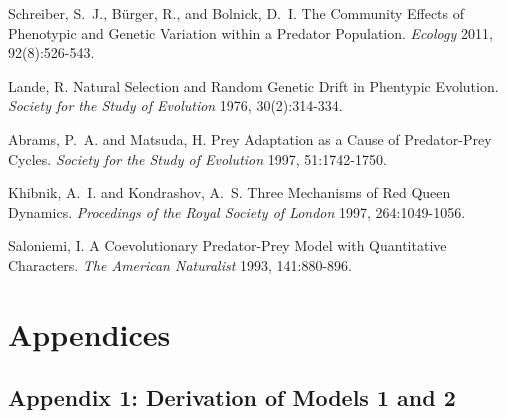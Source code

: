 \documentclass{amsart}
\theoremstyle{definition}
\theoremstyle{remark}
\numberwithin{equation}{section}
\begin{document}
\pagebreak

\begin{thebibliography}{10}

Schreiber, S.~J., B\"urger,  R., and Bolnick,  D.~I.
The Community Effects of Phenotypic and Genetic Variation within a Predator Population.
\emph{Ecology}
2011,  92(8):526-543. 

Lande, R.
Natural Selection and Random Genetic Drift in Phentypic Evolution.
\emph{Society for the Study of Evolution}
1976, 30(2):314-334.

Abrams, P.~A. and Matsuda, H.
Prey Adaptation as a Cause of Predator-Prey Cycles.
\emph{Society for the Study of Evolution}
1997, 51:1742-1750.

Khibnik, A.~I. and Kondrashov, A.~S.
Three Mechanisms of Red Queen Dynamics.
\emph{Procedings of the Royal Society of London}
1997, 264:1049-1056.

Saloniemi, I.
A Coevolutionary Predator-Prey Model with Quantitative Characters.
\emph{The American Naturalist}
1993, 141:880-896.

\end{thebibliography}


































\pagebreak
\section{Appendices}
\subsection{Appendix 1: Derivation of Models 1 and 2}
\end{document}
